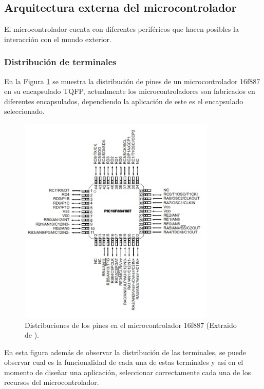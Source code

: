 \documentclass[12pt,a4paper]{article}
\begin{document}
   \subsection{Arquitectura externa del microcontrolador}
   El microcontrolador cuenta con diferentes periféricos que hacen posibles la interacción con el mundo exterior.
   
   \subsubsection{Distribución de terminales}
   
   En la Figura \ref{fig:TQFP} se muestra la distribución de pines de un microcontrolador 16f887 en su encapsulado TQFP, actualmente los microcontroladores son fabricados en diferentes encapsulados, dependiendo la aplicación de este es el encapsulado seleccionado.\\ 
   
   
   \begin{figure}[htpb]
   \centering
   \includegraphics[height=10cm]{TQFP}
   \caption{Distribuciones de los pines en el microcontrolador 16f887 (Extraido de \cite{PIC}).}
   \label{fig:TQFP}
   \end{figure}
   
   En esta figura además de observar la distribución de las terminales, se puede observar cual es la funcionalidad de cada una de estas terminales y así en el momento de diseñar una aplicación, seleccionar correctamente cada una de los recursos del microcontrolador.
   
   \newpage
   \renewcommand{\figurename}{Figura 2.}
   \setcounter{figure}{0}
   \renewcommand{\tablename}{Tabla 2.}
   \setcounter{table}{0}
\end{document}
